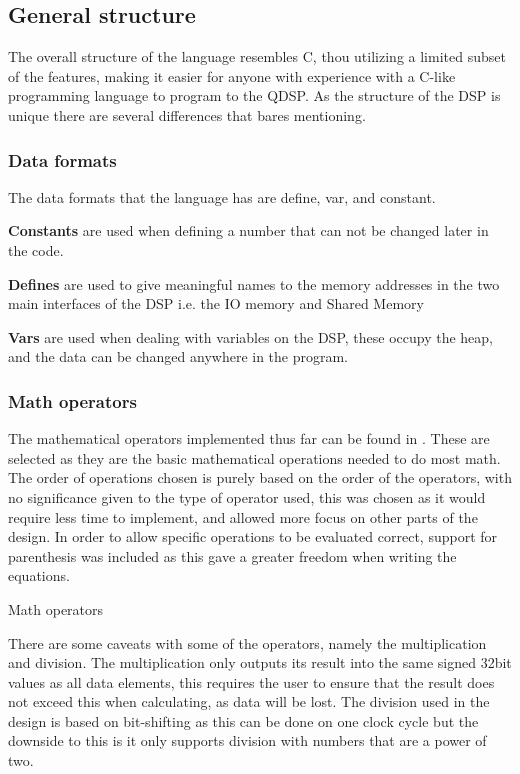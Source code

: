 \subsection{General structure}
The overall structure of the language resembles C, thou utilizing a limited subset of the features, making it easier for anyone with experience with a C-like programming language to program to the QDSP. As the structure of the DSP is unique there are several differences that bares mentioning.

\subsubsection{Data formats}
The data formats that the language has are define, var, and constant.

\textbf{Constants} are used when defining a number that can not be changed later in the code.

\textbf{Defines} are used to give meaningful names to the memory addresses in the two main interfaces of the DSP i.e. the IO memory and Shared Memory

\textbf{Vars} are used when dealing with variables on the DSP, these occupy the heap, and the data can be changed anywhere in the program.

\subsubsection{Math operators}
The mathematical operators implemented thus far can be found in . These are selected as they are the basic mathematical operations needed to do most math. The order of operations chosen is purely based on the order of the operators, with no significance given to the type of operator used, this was chosen as it would require less time to implement, and allowed more focus on other parts of the design. In order to allow specific operations to be evaluated correct, support for parenthesis was included as this gave a greater freedom when writing the equations. 

\begin{savenotes}
	\begin{table}[H]
		\centering
			
			\caption{Math operators}
		\label{tab:mathOperators}
	\end{table}
\end{savenotes}

There are some caveats with some of the operators, namely the multiplication and division. The multiplication only outputs its result into the same signed 32bit values as all data elements, this requires the user to ensure that the result does not exceed this when calculating, as data will be lost. The division used in the design is based on bit-shifting as this can be done on one clock cycle but the downside to this is it only supports division with numbers that are a power of two.

